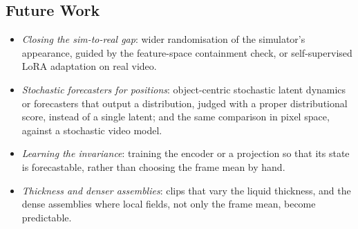 \subsection{Future Work}
\label{sec:future}

\begin{itemize}
  \item \emph{Closing the sim-to-real gap}: wider randomisation of the simulator's
    appearance, guided by the feature-space containment check, or self-supervised LoRA
    adaptation on real video.
  \item \emph{Stochastic forecasters for positions}: object-centric stochastic latent
    dynamics~\cite{lpwm} or forecasters that output a distribution, judged with a
    proper distributional score, instead of a single latent; and the same comparison in
    pixel space, against a stochastic video model.
  \item \emph{Learning the invariance}: training the encoder or a projection so that its
    state is forecastable, rather than choosing the frame mean by hand.
  \item \emph{Thickness and denser assemblies}: clips that vary the liquid thickness, and
    the dense assemblies where local fields, not only the frame mean, become
    predictable.
\end{itemize}
